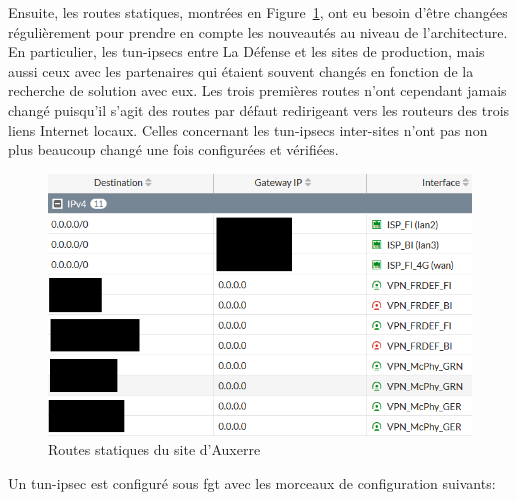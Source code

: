 \documentclass[12pt, oneside, a4paper, titlepage]{report}
\begin{document}
Ensuite, les routes statiques, montrées en Figure~\ref{fig:fgt-auxr/routes}, ont
eu besoin d'être changées régulièrement pour prendre en compte les nouveautés au
niveau de l'architecture. En particulier, les \glspl{tun-ipsec} entre La Défense
et les sites de production, mais aussi ceux avec les partenaires qui étaient
souvent changés en fonction de la recherche de solution avec eux. Les trois
premières routes n'ont cependant jamais changé puisqu'il s'agit des routes par
défaut redirigeant vers les routeurs des trois liens Internet locaux. Celles
concernant les \glspl{tun-ipsec} inter-sites n'ont pas non plus beaucoup changé
une fois configurées et vérifiées.

\begin{figure}[h!]
    \centering
    \includegraphics[width = 0.8\linewidth]{img/fgt-auxr/routes.png}
    \caption{Routes statiques du site d'Auxerre}%
    \label{fig:fgt-auxr/routes}
\end{figure}
\FloatBarrier{}

Un \gls{tun-ipsec} est configuré sous \acrlong{fgt} avec les morceaux de
configuration suivants:
\end{document}
